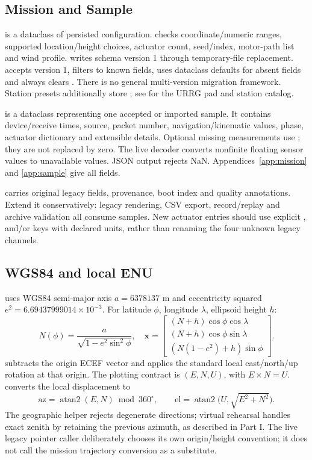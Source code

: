 \subsection{Mission and Sample}
 is a dataclass of persisted configuration. 
checks coordinate/numeric ranges, supported location/height choices, actuator
count, seed/index, motor-path list and wind profile.  writes schema
version 1 through temporary-file replacement.  accepts version 1,
filters to known fields, uses dataclass defaults for absent fields and always
clears . There is no general multi-version migration
framework. Station presets additionally store ; see
 for the URRG pad and station catalog.

 is a dataclass representing one accepted or imported sample.
It contains device/receive times, source, packet number, navigation/kinematic
values, phase, actuator dictionary and extensible details. Optional missing
measurements use ; they are not replaced by zero. The live decoder
converts nonfinite floating sensor values to unavailable values. JSON output
rejects NaN. Appendices~\ref{app:mission} and \ref{app:sample} give all fields.

 carries original legacy fields, provenance, boot index and
quality annotations. Extend it conservatively: legacy rendering, CSV export,
record/replay and archive validation all consume samples. New actuator entries
should use explicit ,  and/or  keys with
declared units, rather than renaming the four unknown legacy channels.

\subsection{WGS84 and local ENU}
 uses WGS84 semi-major axis \(a=6378137\) m and eccentricity squared
\(e^2=6.69437999014\times10^{-3}\).
For latitude \(\phi\), longitude \(\lambda\), ellipsoid height \(h\):
\[
 N(\phi)=\frac{a}{\sqrt{1-e^2\sin^2\phi}},\quad
 \boldsymbol{x}=\begin{bmatrix}
 (N+h)\cos\phi\cos\lambda\\
 (N+h)\cos\phi\sin\lambda\\
 (N(1-e^2)+h)\sin\phi
 \end{bmatrix}.
\]
 subtracts the origin ECEF vector and applies the standard local
east/north/up rotation at that origin. The plotting contract is
\((E,N,U)\), with \(E\times N=U\).
 converts the local displacement to
\[
 \mathrm{az}=\operatorname{atan2}(E,N)\bmod 360^\circ,\qquad
 \mathrm{el}=\operatorname{atan2}\bigl(U,\sqrt{E^2+N^2}\bigr).
\]
The geographic helper rejects degenerate directions; virtual rehearsal handles
exact zenith by retaining the previous azimuth, as described in Part I.
The live legacy pointer caller deliberately chooses its own origin/height
convention; it does not call the mission trajectory conversion as a substitute.

